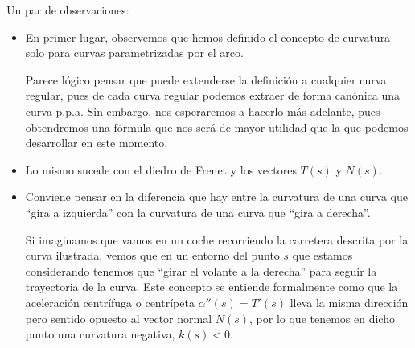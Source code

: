 \begin{observacion}
    Un par de observaciones:
    \begin{itemize}
        \item En primer lugar, observemos que hemos definido el concepto de curvatura solo para curvas parametrizadas por el arco. 

            Parece lógico pensar que puede extenderse la definición a cualquier curva regular, pues de cada curva regular podemos extraer de forma canónica una curva p.p.a. Sin embargo, nos esperaremos a hacerlo más adelante, pues obtendremos una fórmula que nos será de mayor utilidad que la que podemos desarrollar en este momento.

        \item Lo mismo sucede con el diedro de Frenet y los vectores $T(s)$ y $N(s)$.

        \item Conviene pensar en la diferencia que hay entre la curvatura de una curva que ``gira a izquierda'' con la curvatura de una curva que ``gira a derecha''. 
            \begin{figure}[H]
                \centering
            \end{figure}

            \noindent
            Si imaginamos que vamos en un coche recorriendo la carretera descrita por la curva ilustrada, vemos que en un entorno del punto $s$ que estamos considerando tenemos que ``girar el volante a la derecha'' para seguir la trayectoria de la curva. Este concepto se entiende formalmente como que la aceleración centrífuga o centrípeta $\alpha''(s) = T'(s)$ lleva la misma dirección pero sentido opuesto al vector normal $N(s)$, por lo que tenemos en dicho punto una curvatura negativa, $k(s)<0$.


\end{itemize}
\end{observacion}
